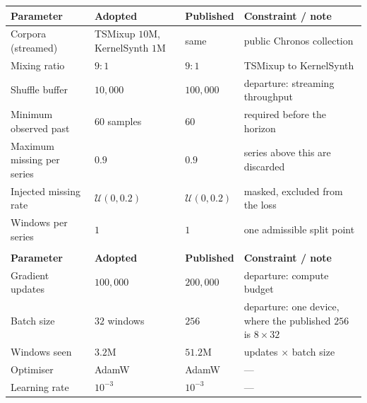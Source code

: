 \begin{table}[!tbp]
\begin{tabular}{@{}M{3.6cm}M{4.4cm}M{2.2cm}M{5.0cm}@{}}
        \textbf{Parameter} & \textbf{Adopted} & \textbf{Published} & \textbf{Constraint / note} \\
        \midrule
        Corpora (streamed)          & TSMixup $10$M, KernelSynth $1$M    & same                & public Chronos collection \\
        \rowsep%
        Mixing ratio                & $9{:}1$                            & $9{:}1$             & TSMixup to KernelSynth \\
        \rowsep%
        Shuffle buffer              & $10{,}000$                         & $100{,}000$         & departure: streaming throughput \\
        \rowsep%
        Minimum observed past       & $60$ samples                       & $60$                & required before the horizon \\
        \rowsep%
        Maximum missing per series  & $0.9$                              & $0.9$               & series above this are discarded \\
        \rowsep%
        Injected missing rate       & $\mathcal U(0,0.2)$                & $\mathcal U(0,0.2)$ & masked, excluded from the loss \\
        \rowsep%
        Windows per series          & $1$                                & $1$                 & one admissible split point \\
        \addlinespace[12pt]
        \midrule[\heavyrulewidth]
        \addlinespace[3pt]
        \\
        \textbf{Parameter} & \textbf{Adopted} & \textbf{Published} & \textbf{Constraint / note} \\
        \midrule
        Gradient updates            & $100{,}000$                        & $200{,}000$         & departure: compute budget \\
        \rowsep%
        Batch size                  & $32$ windows                       & $256$               & departure: one device, where the published $256$ is $8\times32$ \\
        \rowsep%
        Windows seen                & $3.2$M                             & $51.2$M             & updates $\times$ batch size \\
        \rowsep%
        Optimiser                   & AdamW                              & AdamW               & --- \\
        \rowsep%
        Learning rate               & $10^{-3}$                          & $10^{-3}$           & --- \\

\end{tabular}
\end{table}
